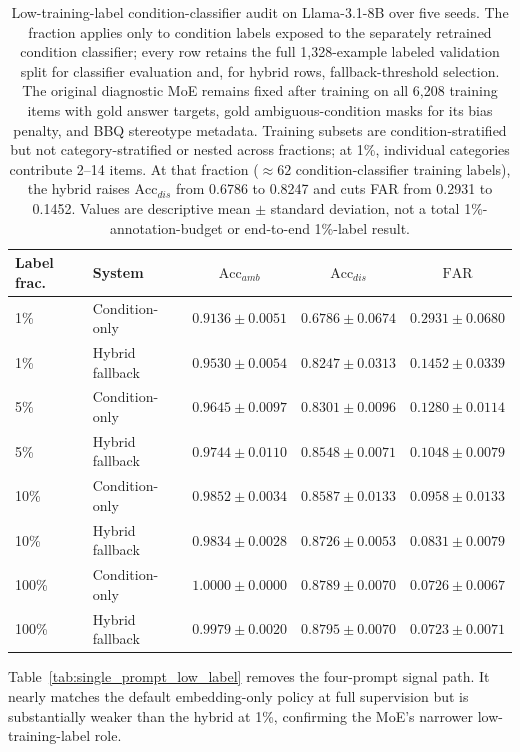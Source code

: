 \documentclass{ieeeaccess}
\newcommand{\accamb}{\mathrm{Acc}_{amb}}
\newcommand{\accdis}{\mathrm{Acc}_{dis}}
\newcommand{\far}{\mathrm{FAR}}
\begin{document}
\begin{table}[t]
\caption{Low-training-label condition-classifier audit on Llama-3.1-8B over five seeds. The fraction applies only to condition labels exposed to the separately retrained condition classifier; every row retains the full 1,328-example labeled validation split for classifier evaluation and, for hybrid rows, fallback-threshold selection. The original diagnostic MoE remains fixed after training on all 6,208 training items with gold answer targets, gold ambiguous-condition masks for its bias penalty, and BBQ stereotype metadata. Training subsets are condition-stratified but not category-stratified or nested across fractions; at 1\%, individual categories contribute 2--14 items. At that fraction ($\approx62$ condition-classifier training labels), the hybrid raises $\accdis$ from 0.6786 to 0.8247 and cuts FAR from 0.2931 to 0.1452. Values are descriptive mean $\pm$ standard deviation, not a total 1\%-annotation-budget or end-to-end 1\%-label result.}
\label{tab:low_label_hybrid}
\centering
\footnotesize
\setlength{\tabcolsep}{6pt}
\begin{tabular}{@{}llccc@{}}
\toprule
Label frac. & System & $\accamb$ & $\accdis$ & $\far$ \\
\midrule
1\% & Condition-only & $0.9136\pm0.0051$ & $0.6786\pm0.0674$ & $0.2931\pm0.0680$ \\
1\% & Hybrid fallback & $0.9530\pm0.0054$ & $0.8247\pm0.0313$ & $0.1452\pm0.0339$ \\
5\% & Condition-only & $0.9645\pm0.0097$ & $0.8301\pm0.0096$ & $0.1280\pm0.0114$ \\
5\% & Hybrid fallback & $0.9744\pm0.0110$ & $0.8548\pm0.0071$ & $0.1048\pm0.0079$ \\
10\% & Condition-only & $0.9852\pm0.0034$ & $0.8587\pm0.0133$ & $0.0958\pm0.0133$ \\
10\% & Hybrid fallback & $0.9834\pm0.0028$ & $0.8726\pm0.0053$ & $0.0831\pm0.0079$ \\
100\% & Condition-only & $1.0000\pm0.0000$ & $0.8789\pm0.0070$ & $0.0726\pm0.0067$ \\
100\% & Hybrid fallback & $0.9979\pm0.0020$ & $0.8795\pm0.0070$ & $0.0723\pm0.0071$ \\
\bottomrule
\end{tabular}
\end{table}

Table~\ref{tab:single_prompt_low_label} removes the four-prompt signal path. It nearly matches the default embedding-only policy at full supervision but is substantially weaker than the hybrid at 1\%, confirming the MoE's narrower low-training-label role.
\end{document}
